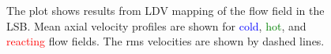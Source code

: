 \begin{figure}

\centering



\caption[Effect of preheat temperature on the LSB flow field - I]{The plot shows results from LDV mapping of the flow field in the LSB. Mean axial velocity profiles are shown for \textcolor{blue}{cold}, \textcolor{green}{hot}, and \textcolor{red}{reacting} flow fields. The rms velocities are shown by dashed lines.}

\label{fig:temperatureLDVResults}

\end{figure}

